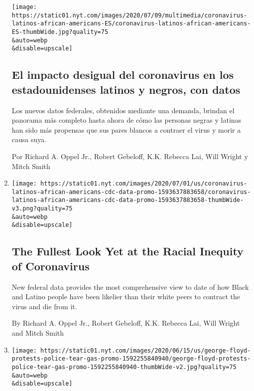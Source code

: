 \begin{enumerate}
  \texttt{[image: https://static01.nyt.com/images/2020/07/09/multimedia/coronavirus-latinos-african-americans-ES/coronavirus-latinos-african-americans-ES-thumbWide.jpg?quality=75\\\&auto=webp\\\&disable=upscale]}

  \hypertarget{el-impacto-desigual-del-coronavirus-en-los-estadounidenses-latinos-y-negros-con-datos}{%
  \subsection{El impacto desigual del coronavirus en los estadounidenses
  latinos y negros, con
  datos}\label{el-impacto-desigual-del-coronavirus-en-los-estadounidenses-latinos-y-negros-con-datos}}

  Los nuevos datos federales, obtenidos mediante una demanda, brindan el
  panorama más completo hasta ahora de cómo las personas negras y
  latinas han sido más propensas que sus pares blancos a contraer el
  virus y morir a causa suya.

  Por Richard A. Oppel Jr., Robert Gebeloff, K.K. Rebecca Lai, Will
  Wright y Mitch Smith
\item
  \href{/interactive/2020/07/05/us/coronavirus-latinos-african-americans-cdc-data.html}{}

  \texttt{[image: https://static01.nyt.com/images/2020/07/01/us/coronavirus-latinos-african-americans-cdc-data-promo-1593637883658/coronavirus-latinos-african-americans-cdc-data-promo-1593637883658-thumbWide-v3.png?quality=75\\\&auto=webp\\\&disable=upscale]}

  \hypertarget{the-fullest-look-yet-at-the-racial-inequity-of-coronavirus}{%
  \subsection{The Fullest Look Yet at the Racial Inequity of
  Coronavirus}\label{the-fullest-look-yet-at-the-racial-inequity-of-coronavirus}}

  New federal data provides the most comprehensive view to date of how
  Black and Latino people have been likelier than their white peers to
  contract the virus and die from it.

  By Richard A. Oppel Jr., Robert Gebeloff, K.K. Rebecca Lai, Will
  Wright and Mitch Smith
\item
  \href{/interactive/2020/06/16/us/george-floyd-protests-police-tear-gas.html}{}

  \texttt{[image: https://static01.nyt.com/images/2020/06/15/us/george-floyd-protests-police-tear-gas-promo-1592255840940/george-floyd-protests-police-tear-gas-promo-1592255840940-thumbWide-v2.jpg?quality=75\\\&auto=webp\\\&disable=upscale]}


\end{enumerate}
